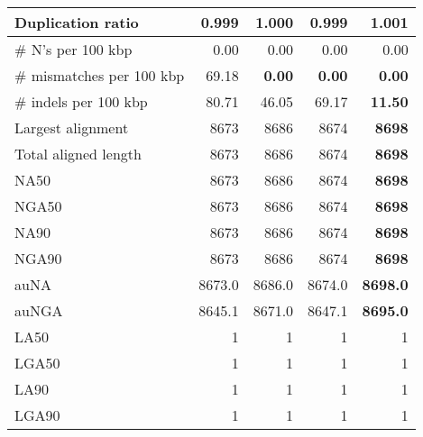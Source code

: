\documentclass[12pt,a4paper]{article}
\begin{document}
\begin{table}[ht]
\begin{center}
\begin{tabular}{|l*{4}{|r}|}
Duplication ratio & {\bf 0.999} & 1.000 & {\bf 0.999} & 1.001 \\ \hline
\# N's per 100 kbp & 0.00 & 0.00 & 0.00 & 0.00 \\ \hline
\# mismatches per 100 kbp & 69.18 & {\bf 0.00} & {\bf 0.00} & {\bf 0.00} \\ \hline
\# indels per 100 kbp & 80.71 & 46.05 & 69.17 & {\bf 11.50} \\ \hline
Largest alignment & 8673 & 8686 & 8674 & {\bf 8698} \\ \hline
Total aligned length & 8673 & 8686 & 8674 & {\bf 8698} \\ \hline
NA50 & 8673 & 8686 & 8674 & {\bf 8698} \\ \hline
NGA50 & 8673 & 8686 & 8674 & {\bf 8698} \\ \hline
NA90 & 8673 & 8686 & 8674 & {\bf 8698} \\ \hline
NGA90 & 8673 & 8686 & 8674 & {\bf 8698} \\ \hline
auNA & 8673.0 & 8686.0 & 8674.0 & {\bf 8698.0} \\ \hline
auNGA & 8645.1 & 8671.0 & 8647.1 & {\bf 8695.0} \\ \hline
LA50 & 1 & 1 & 1 & 1 \\ \hline
LGA50 & 1 & 1 & 1 & 1 \\ \hline
LA90 & 1 & 1 & 1 & 1 \\ \hline
LGA90 & 1 & 1 & 1 & 1 \\ \hline
\end{tabular}
\end{center}
\end{table}
\end{document}
